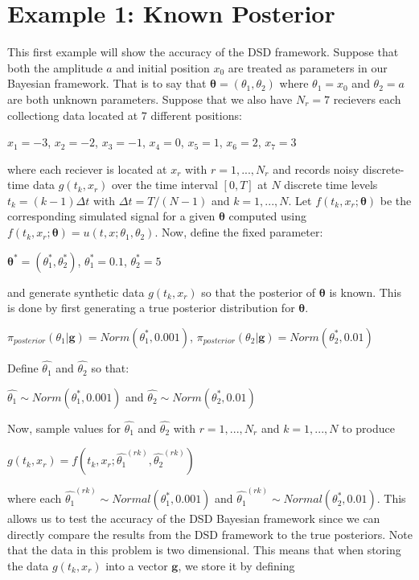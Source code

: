 \documentclass[botnum, fleqn]{unmeethesis}
\begin{document}
\section{\label{section:Example 1: Known Posterior}Example 1: Known Posterior}
This first example will show the accuracy of the DSD framework. Suppose that both the amplitude $a$ and initial position $x_0$ are treated as parameters in our Bayesian framework. That is to say that $\bm{\theta}=(\theta_1,\theta_2)$ where $\theta_1=x_0$ and $\theta_2=a$ are both unknown parameters. Suppose that we also have $N_r=7$ recievers each collectiong data located at $7$ different positions:
\begin{center}
	$x_1=-3$, $x_2=-2$, $x_3=-1$, $x_4=0$, $x_5=1$, $x_6=2$, $x_7=3$
\end{center}  
where each reciever is located at $x_r$ with $r=1,...,N_r$ and records noisy discrete-time data $g(t_k,x_r)$ over the time interval $[0,T]$ at $N$ discrete time levels $t_k=(k-1)\Delta t$ with $\Delta t=T/(N-1)$ and $k=1,...,N$. Let $f(t_k,x_r;\bm{\theta})$ be the corresponding simulated signal for a given $\bm{\theta}$ computed using $f(t_k,x_r;\bm{\theta})=u(t,x;\theta_1,\theta_2)$. Now, define the fixed parameter:
\begin{center}
	$\bm{\theta^*}=(\theta_1^*,\theta_2^*)$, \hspace{1cm}$\theta_1^*=0.1$, \hspace{1cm}$\theta_2^*=5$
\end{center}
and generate synthetic data $g(t_k,x_r)$ so that the posterior of $\bm{\theta}$ is known. This is done by first generating a true posterior distribution for $\bm{\theta}$.
\begin{center}
	$\pi_{posterior}(\theta_1|\bm{g})=Norm(\theta_1^*,0.001)$, \hspace{1cm} $\pi_{posterior}(\theta_2|\bm{g})=Norm(\theta_2^*,0.01)$
\end{center}
Define $\widehat{\theta_1}$ and $\widehat{\theta_2}$ so that:
\begin{center}
	$\widehat{\theta_1}\sim Norm(\theta_1^*,0.001)$ and $\widehat{\theta_2}\sim Norm(\theta_2^*,0.01)$
\end{center}
Now, sample values for $\widehat{\theta_1}$ and $\widehat{\theta_2}$ with $r=1,...,N_r$ and $k=1,...,N$ to produce 
\begin{center}
	$g(t_k,x_r)=f(t_k,x_r;\widehat{\theta_1}^{(rk)},\widehat{\theta_2}^{(rk)})$
\end{center}
where each $\widehat{\theta_1}^{(rk)}\sim Normal(\theta_1^*,0.001)$ and $\widehat{\theta_1}^{(rk)}\sim Normal(\theta_2^*,0.01)$. This allows us to test the accuracy of the DSD Bayesian framework since we can directly compare the results from the DSD framework to the true posteriors. Note that the data in this problem is two dimensional. This means that when storing the data $g(t_k,x_r)$ into a vector $\bm{g}$, we store it by defining
\end{document}
